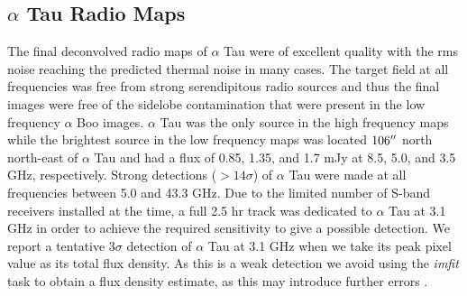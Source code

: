 \documentclass[iop]{emulateapj}
\begin{document}
\subsection{$\alpha$ Tau Radio Maps} \label{results2}
The final deconvolved radio maps of $\alpha$ Tau were of excellent quality with the rms noise reaching the predicted thermal noise in many cases. The target field at all frequencies was free from strong serendipitous radio sources and thus the final images were free of the sidelobe contamination that were present in the low frequency $\alpha$ Boo images. $\alpha$ Tau was the only source in the high frequency maps while the brightest source in the low frequency maps was located $106\mbox{$^{\prime\prime}$}$ north north-east of $\alpha$ Tau and had a flux of 0.85, 1.35, and 1.7 mJy at 8.5, 5.0, and 3.5 GHz, respectively. Strong detections ($>14\sigma$) of $\alpha$ Tau were made at all frequencies between 5.0 and 43.3 GHz. Due to the limited number of S-band receivers installed at the time, a full 2.5 hr track was dedicated to $\alpha$ Tau at 3.1 GHz in order to achieve the required sensitivity to give a possible detection. We report a tentative $3\sigma$ detection of $\alpha$ Tau at 3.1 GHz when we take its peak pixel value as its total flux density. As this is a weak detection we avoid using the \textit{imfit} task to obtain a flux density estimate, as this may introduce further errors \citep{1999ASPC..180.....T}.
\end{document}
